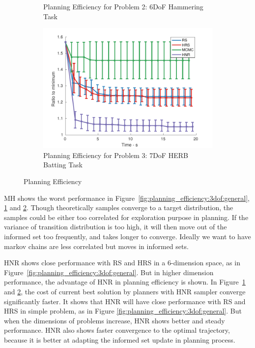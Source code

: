 \documentclass[letterpaper, 10 pt, conference]{ieeeconf}  %
\begin{document}
\begin{figure}[t!]
\begin{subfigure}[b]{0.32\textwidth}
		\caption{\captionstyle Planning Efficiency for Problem 2: 6DoF Hammering Task}
		\label{fig:planning_efficiency:6dof:hammering}
	\end{subfigure}
	\begin{subfigure}[b]{0.32\textwidth}
	\includegraphics[width=\linewidth]{fig/planning_efficiency/herb_batting_efficiency}
	\caption{\captionstyle Planning Efficiency for Problem 3: 7DoF HERB Batting Task}
	\label{fig:planning_efficiency:herb:batting}
    \end{subfigure}
	\caption{Planning Efficiency}
	\label{fig:planning_efficiency}
\end{figure} 


MH shows the worst performance in Figure~\ref{fig:planning_efficiency:3dof:general}, \ref{fig:planning_efficiency:6dof:hammering} and \ref{fig:planning_efficiency:herb:batting}.
Though theoretically samples converge to a target distribution, the samples could be either too correlated for exploration purpose in planning.
If the variance of transition distribution is too high, it will then move out of the informed set too frequently, and takes longer to converge.
Ideally we want to have markov chains are less correlated but moves in informed sets.

HNR shows close performance with RS and HRS in a 6-dimension space, as in Figure~\ref{fig:planning_efficiency:3dof:general}.
But in higher dimension performance, the advantage of HNR in planning efficiency is shown.
In Figure~\ref{fig:planning_efficiency:6dof:hammering} and \ref{fig:planning_efficiency:herb:batting}, the cost of current best solution by planners with HNR sampler converge significantly faster.
It shows that HNR will have close performance with RS and HRS in simple problem, as in Figure \ref{fig:planning_efficiency:3dof:general}.
But when the dimensions of problems increase, HNR shows better and steady performance.
HNR also shows faster convergence to the optimal trajectory, because it is better at adapting the informed set update in planning process. 
\end{document}
